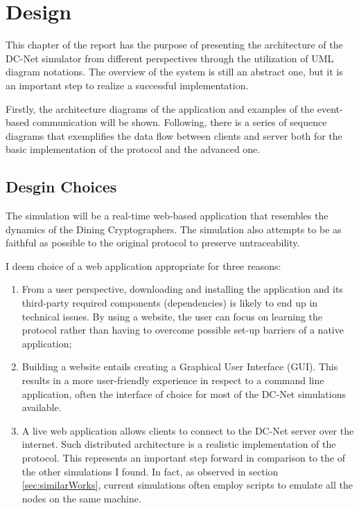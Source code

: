 \chapter{Design} \label{chapter:design}
This chapter of the report has the purpose of presenting the architecture of the DC-Net simulator from different perspectives through the utilization of UML diagram notations. The overview of the system is still an abstract one, but it is an important step to realize a successful implementation. 

Firstly, the architecture diagrams of the application and examples of the event-based communication will be shown. Following, there is a series of sequence diagrams that exemplifies the data flow between clients and server both for the basic implementation of the protocol and the advanced one.

\section{Desgin Choices}
The simulation will be a real-time web-based application that resembles the dynamics of the Dining Cryptographers. The simulation also attempts to be as faithful as possible to the original protocol to preserve untraceability.

I deem choice of a web application appropriate for three reasons:
\begin{enumerate}
    \item From a user perspective, downloading and installing the application and its third-party required components (dependencies) is likely to end up in technical issues. By using a website, the user can focus on learning the protocol rather than having to overcome possible set-up barriers of a native application;
    \item Building a website entails creating a Graphical User Interface (GUI). This results in a more user-friendly experience in respect to a command line application, often the interface of choice for most of the DC-Net simulations available.
    \item A live web application allows clients to connect to the DC-Net server over the internet. Such distributed architecture is a realistic implementation of the protocol. This represents an important step forward in comparison to the of the other simulations I found. In fact, as observed in section \ref{sec:similarWorks}, current simulations often employ scripts to emulate all the nodes on the same machine.
\end{enumerate}

